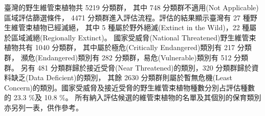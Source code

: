 臺灣的野生維管束植物共 5219 分類群，
其中 748 分類群不適用(Not Applicable)區域評估篩選條件，
4471 分類群進入評估流程。評估的結果顯示臺灣有 27 種野生維管束植物已經滅絕，
其中 5 種屬於野外絕滅(Extinct in the Wild)，22 種屬於區域滅絕(Regionally Extinct)。
國家受威脅(National Threatened)野生維管束植物共有 1040 分類群，
其中屬於極危(Critically Endangered)類別有 217 分類群，
瀕危(Endangered)類別有 282 分類群，易危(Vulnerable)類別有 512 分類群。
另有 481 分類群歸於接近受脅(Near Threatened)的類別，320 分類群歸於資料缺乏(Data Deficient)的類別，
其餘 2630 分類群則屬於暫無危機(Least Concern)的類別。國家受威脅及接近受脅的野生維管束植物種數分別占評估種數的 23.3 \%及 10.8 \%。
所有納入評估候選的維管束植物的名單及其個別的保育類別亦另列一表，供作參考。

